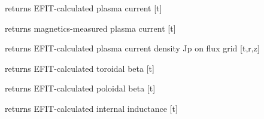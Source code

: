 \documentclass[letterpaper,10pt,english]{sphinxmanual}
\begin{document}
\begin{fulllineitems}
\begin{fulllineitems}
\end{fulllineitems}


\begin{fulllineitems}
\label{eqtools:eqtools.EFIT.EFITTree.getIpCalc}
returns EFIT-calculated plasma current {[}t{]}

\end{fulllineitems}


\begin{fulllineitems}
\label{eqtools:eqtools.EFIT.EFITTree.getIpMeas}
returns magnetics-measured plasma current {[}t{]}

\end{fulllineitems}


\begin{fulllineitems}
\label{eqtools:eqtools.EFIT.EFITTree.getJp}
returns EFIT-calculated plasma current density Jp on flux grid {[}t,r,z{]}

\end{fulllineitems}


\begin{fulllineitems}
\label{eqtools:eqtools.EFIT.EFITTree.getBetaT}
returns EFIT-calculated toroidal beta {[}t{]}

\end{fulllineitems}


\begin{fulllineitems}
\label{eqtools:eqtools.EFIT.EFITTree.getBetaP}
returns EFIT-calculated poloidal beta {[}t{]}

\end{fulllineitems}


\begin{fulllineitems}
\label{eqtools:eqtools.EFIT.EFITTree.getLi}
returns EFIT-calculated internal inductance {[}t{]}


\end{fulllineitems}
\end{fulllineitems}
\end{document}

